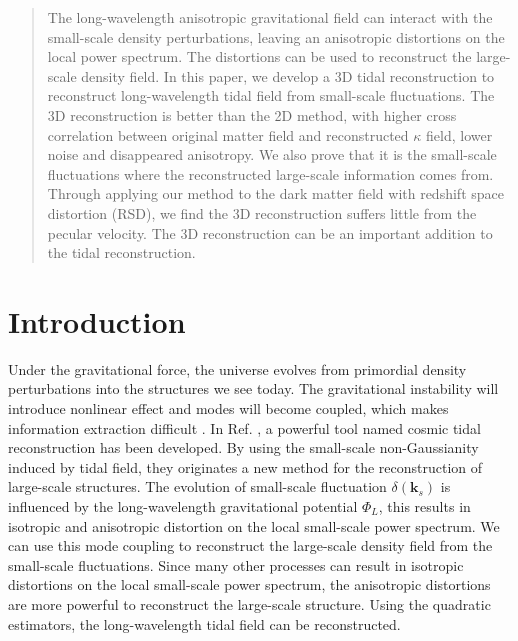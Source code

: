 \documentclass[aps,prd,twocolumn,showpacs,superscriptaddress,groupedaddress,nofootinbib]{revtex4}  %
\begin{document}
\begin{abstract}
The long-wavelength anisotropic gravitational field can interact with the small-scale density perturbations, leaving an anisotropic distortions on the local power spectrum. The distortions can be used to reconstruct the large-scale density field. In this paper, we develop a 3D tidal reconstruction to reconstruct long-wavelength tidal field from small-scale fluctuations. The 3D reconstruction is better than the 2D method, with higher cross correlation between original matter field and reconstructed $\kappa$ field, lower noise and disappeared anisotropy. We also prove that it is the small-scale fluctuations where the reconstructed large-scale information comes from. Through applying our method to the dark matter field with redshift space distortion (RSD), we find the 3D reconstruction suffers little from the pecular velocity. The 3D reconstruction can be an important addition to the tidal reconstruction.

\end{abstract}

\pacs{}
\maketitle

\section{Introduction}\label{section:Introduction}
Under the gravitational force, the universe evolves from primordial density perturbations into the structures we see today. The gravitational instability will introduce nonlinear effect and modes will become coupled, which makes information extraction difficult \cite{1999MNRAS.308.1179M}. In Ref. \cite{2012:pen, 2016PhRvD..93j3504Z}, a powerful tool named cosmic tidal reconstruction has been developed. By using the small-scale non-Gaussianity induced by tidal field, they originates a new method for the reconstruction of large-scale structures. The evolution of small-scale fluctuation $\delta(\bm{k}_{s})$ is influenced by the long-wavelength gravitational potential $\Phi_{L}$, this results in isotropic and anisotropic distortion on the local small-scale power spectrum. We can use this mode coupling to reconstruct the large-scale density field from the small-scale fluctuations. Since many other processes can result in isotropic distortions on the local small-scale power spectrum, the anisotropic distortions are more powerful to reconstruct the large-scale structure. Using the quadratic estimators, the long-wavelength tidal field can be reconstructed.
\end{document}
